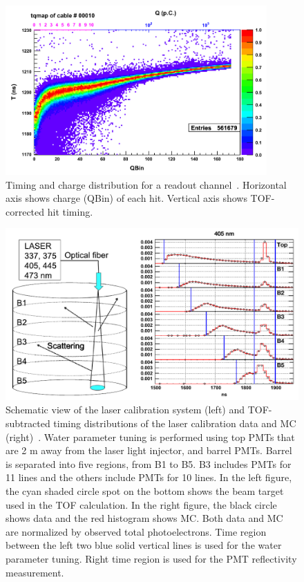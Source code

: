\begin{figure}[tbp]
	\centering
	\includegraphics[width=10cm]{Figures/Calibration/TQ}
	\caption[Timing and charge distribution for a readout channel]{\label{Calibration_TQ} Timing and charge distribution for a readout channel~\cite{2014AbeCalib}. Horizontal axis shows charge (QBin) of each hit. Vertical axis shows TOF-corrected hit timing.}
\end{figure}

\begin{figure}[tbp]
	\centering
	\includegraphics[width=12cm]{Figures/Calibration/LaserCalib}
	\caption[Schematic view of the laser calibration system and TOF-subtracted timing distributions of the laser calibration data and MC]{\label{Calibration_LaserCalib} Schematic view of the laser calibration system (left) and TOF-subtracted timing distributions of the laser calibration data and MC (right)~\cite{2014AbeCalib}. Water parameter tuning is performed using top PMTs that are 2 m away from the laser light injector, and barrel PMTs. Barrel is separated into five regions, from B1 to B5. B3 includes PMTs for 11 lines and the others include PMTs for 10 lines. In the left figure, the cyan shaded circle spot on the bottom shows the beam target used in the TOF calculation. In the right figure, the black circle shows data and the red histogram shows MC. Both data and MC are normalized by observed total photoelectrons. Time region between the left two blue solid vertical lines is used for the water parameter tuning. Right time region is used for the PMT reflectivity measurement.}
\end{figure}

